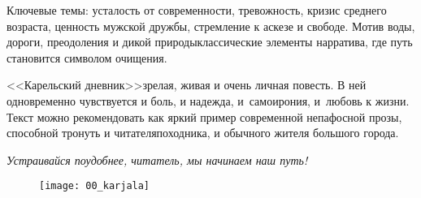 {\small%
		

Ключевые темы: усталость от современности, тревожность, кризис среднего возраста, ценность мужской дружбы, стремление к аскезе и свободе. Мотив воды, дороги, преодоления и дикой природы\mdash классические элементы нарратива, где путь становится символом очищения.


<<Карельский дневник>>\mdash зрелая, живая и очень личная повесть. В ней одновременно чувствуется и боль, и надежда, и~самоирония, и~любовь к жизни. Текст можно рекомендовать как яркий пример современной непафосной прозы, способной тронуть и читателя\sdash походника, и обычного жителя большого города.

}

\vspace{1.0mm}

\noindent\textit{Устраивайся поудобнее, читатель, мы начинаем наш путь!}

\vspace{1.0mm}

\begin{figure}[h]
	\centering
	\texttt{[image: 00\_karjala]}
\end{figure}

\vspace{5mm}

\vspace{\fill}
\noindent
\begin{minipage}[t]{0.2\textwidth}
	\raggedright ~
\end{minipage}
\hfill
\begin{minipage}[t]{0.8\textwidth}
\end{minipage}
\clearpage


